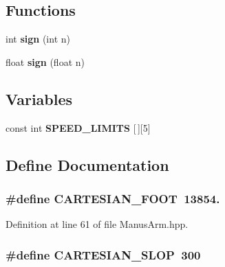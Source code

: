 \subsection*{\-Functions}
\begin{DoxyCompactItemize}
\item 
int {\bf sign} (int n)
\item 
float {\bf sign} (float n)
\end{DoxyCompactItemize}
\subsection*{\-Variables}
\begin{DoxyCompactItemize}
\item 
const int {\bf \-S\-P\-E\-E\-D\-\_\-\-L\-I\-M\-I\-T\-S} [$\,$][5]
\end{DoxyCompactItemize}


\subsection{\-Define \-Documentation}
\subsubsection[{\-C\-A\-R\-T\-E\-S\-I\-A\-N\-\_\-\-F\-O\-O\-T}]{\setlength{\rightskip}{0pt plus 5cm}\#define {\bf \-C\-A\-R\-T\-E\-S\-I\-A\-N\-\_\-\-F\-O\-O\-T}~13854.}\label{ManusArm_8hpp_a148b505ab6c99cbd4895d8ba33055e9e}


\-Definition at line 61 of file \-Manus\-Arm.\-hpp.

\subsubsection[{\-C\-A\-R\-T\-E\-S\-I\-A\-N\-\_\-\-S\-L\-O\-P}]{\setlength{\rightskip}{0pt plus 5cm}\#define {\bf \-C\-A\-R\-T\-E\-S\-I\-A\-N\-\_\-\-S\-L\-O\-P}~300}\label{ManusArm_8hpp_ad06229aafee4a08b31b8bcfdc78aa918}


